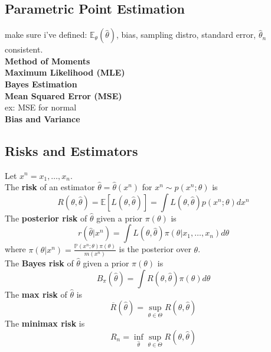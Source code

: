 \documentclass[10pt,twocolumn]{article}
\begin{document}
\subsection*{Parametric Point Estimation}
make sure i've defined: $\mathbb{E}_{\theta}(\hat{\theta})$, bias, sampling distro, standard error, $\hat{\theta}_{n}$ consistent.\\
\textbf{Method of Moments}\\
\textbf{Maximum Likelihood (MLE)}\\
\textbf{Bayes Estimation}\\
\textbf{Mean Squared Error (MSE)}\\
ex: MSE for normal\\
\textbf{Bias and Variance}\\


\subsection*{Risks and Estimators}
Let $x^{n} = x_{1},\ldots,x_{n}$.\\
The \textbf{risk} of an estimator $\hat{\theta} = \hat{\theta}(x^{n})$ for $x^{n} \sim p(x^{n};\theta)$ is
\begin{equation}
    R(\theta,\hat{\theta}) = \mathbb{E}[L(\theta,\hat{\theta})] = \int L(\theta,\hat{\theta}) p(x^{n};\theta) dx^{n}
\end{equation}
The \textbf{posterior risk} of $\hat{\theta}$ given a prior $\pi(\theta)$ is
\begin{equation}
    r(\hat{\theta}|x^{n}) = \int L(\theta,\hat{\theta}) \pi(\theta|x_{1},\ldots,x_{n}) d\theta    
\end{equation}
where $\pi(\theta|x^{n}) = \frac{\mathbb{P}(x^{n};\theta)\pi(\theta)}{m(x^{n})}$ is the posterior over $\theta$.\\
The \textbf{Bayes risk} of $\hat{\theta}$ given a prior $\pi(\theta)$ is
\begin{equation}
    B_{\pi}(\hat{\theta}) = \int R(\theta,\hat{\theta}) \pi(\theta) d\theta
\end{equation}
The \textbf{max risk} of $\hat{\theta}$ is
\begin{equation}
    \overline{R}(\hat{\theta}) = \sup_{\theta \in \Theta} R(\theta,\hat{\theta})
\end{equation}
The \textbf{minimax risk} is
\begin{equation}
    R_{n} = \inf_{\hat{\theta}} \sup_{\theta \in \Theta} R(\theta,\hat{\theta})
\end{equation}
\end{document}

